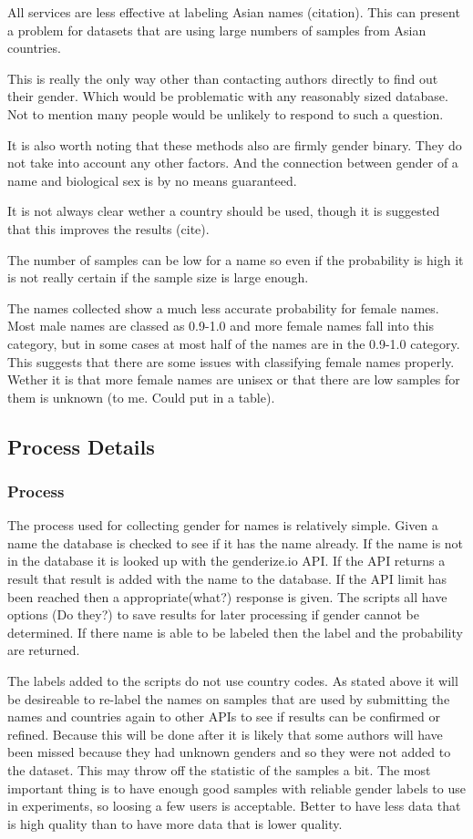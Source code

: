 \documentclass{article}
\begin{document}
All services are less effective at labeling Asian names (citation). This can present a problem for datasets that are using large numbers of samples from Asian countries.

This is really the only way other than contacting authors directly to find out their gender. Which would be problematic with any reasonably sized database. Not to mention many people would be unlikely to respond to such a question.

It is also worth noting that these methods also are firmly gender binary. They do not take into account any other factors. And the connection between gender of a name and biological sex is by no means guaranteed.

It is not always clear wether a country should be used, though it is suggested that this improves the results (cite).

The number of samples can be low for a name so even if the probability is high it is not really certain if the sample size is large enough.

The names collected show a much less accurate probability for female names. Most male names are classed as 0.9-1.0 and more female names fall into this category, but in some cases at most half of the names are in the 0.9-1.0 category. This suggests that there are some issues with classifying female names properly. Wether it is that more female names are unisex or that there are low samples for them is unknown (to me. Could put in a table).


\subsection{Process Details}
\subsubsection{Process}
The process used for collecting gender for names is relatively simple. Given a name the database is checked to see if it has the name already. If the name is not in the database it is looked up with the genderize.io API. If the API returns a result that result is added with the name to the database. If the API limit has been reached then a appropriate(what?) response is given. The scripts all have options (Do they?) to save results for later processing if gender cannot be determined. If there name is able to be labeled then the label and the probability are returned.

The labels added to the scripts do not use country codes. As stated above it will be desireable to re-label the names on samples that are used by submitting the names and countries again to other APIs to see if results can be confirmed or refined. Because this will be done after it is likely that some authors will have been missed because they had unknown genders and so they were not added to the dataset. This may throw off the statistic of the samples a bit. The most important thing is to have enough good samples with reliable gender labels to use in experiments, so loosing a few users is acceptable. Better to have less data that is high quality than to have more data that is lower quality.
\end{document}
